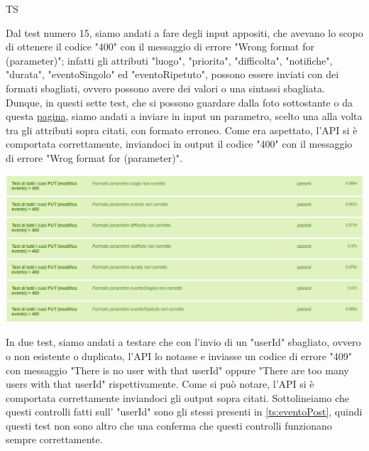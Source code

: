 \begin{listaPersonale}{TS}
\begin{center}
                \end{center}
                Dal test numero 15, siamo andati a fare degli input appositi, che avevano lo scopo di ottenere il codice "400" con il messaggio di errore "Wrong format for (parameter)";  infatti gli attributi "luogo", "priorita", "difficolta", "notifiche", "durata", "eventoSingolo" ed "eventoRipetuto", possono essere inviati con dei formati sbagliati, ovvero possono avere dei valori o una sintassi sbagliata. Dunque, in questi sette test, che si possono guardare dalla foto sottostante o da questa \href{https://plan-it.it/test-report.html} {pagina}, siamo andati a inviare in input un parametro, scelto una alla volta tra gli attributi sopra citati, con formato erroneo. Come era aspettato, l'API si è comportata correttamente, inviandoci in output il codice "400" con il messaggio di errore "Wrog format for (parameter)".
                \begin{center}
                        \includegraphics[width=1\textwidth, height=0.27\textheight]{img/png/tests/EventoPut/400_wrongFormat_PutEvento.png}
                \end{center}
                In due test, siamo andati a testare che con l'invio di un "userId" sbagliato, ovvero o non esistente o duplicato, l'API lo notasse e inviasse un codice di errore "409" con messaggio "There is no user with that userId" oppure "There are too many users with that userId" rispettivamente. Come si può notare, l'API si è comportata correttamente inviandoci gli output sopra citati. Sottolineiamo che questi controlli fatti sull' "userId" sono gli stessi presenti in \ref{ts:eventoPost}, quindi questi test non sono altro che una conferma che questi controlli funzionano sempre correttamente.

\end{listaPersonale}
